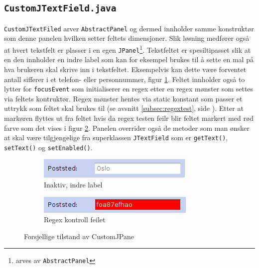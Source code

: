 \subsection{\texttt{CustomJTextField.java}}
\texttt{CustomJTextFiled} arver \texttt{AbstractPanel} og dermed innholder samme konstruktør som denne panelen hvilken setter feltets dimensjoner. Slik løsning medfører også at hvert tekstfelt er plasser i en egen \texttt{JPanel}\footnote{arves av \texttt{AbstractPanel}}.
Tekstfeltet er spesiltipasset slik at en den innholder en indre label som kan for eksempel brukes til å sette en mal på hva brukeren skal skrive inn i tekstfeltet. Eksempelvis kan dette være forventet antall sifferer i et telefon- eller personnummer, figur \ref{fig:custom1}. Feltet innholder også to lytter for \texttt{focusEvent} som initialiserer en regex etter en regex mønster som settes via feltets kontruktør. Regex mønster hentes via static konstant som passer et uttrykk som feltet skal brukes til (se avsnitt \ref{subsec:regextest}, side \pageref{subsec:regextest}). Etter at markøren flyttes ut fra feltet hvis da regex testen feilr blir feltet markert med rød farve som det vises i figur \ref{fig:custom2}.
Panelen overrider også de metoder som man ønsker at skal være tilgjengelige fra superklassen \texttt{JTextField} som er \texttt{getText()}, \texttt{setText()} og \texttt{setEnabled()}.

\begin{figure}[ht!]
\centering
\begin{subfigure}[b]{1\textwidth}
\centering

\includegraphics[scale=0.7]{./img/produktdokumentasjon/swing_componenter/1.png}
\caption{Inaktiv, indre label}
\label{fig:custom1}
\end{subfigure}
\quad

\begin{subfigure}[b]{1\textwidth}
\centering
\includegraphics[scale=0.7]{./img/produktdokumentasjon/swing_componenter/2.png}
\caption{Regex kontroll feilet}
\label{fig:custom2}
\end{subfigure}
\quad

\caption{Forsjellige tilstand av CustomJPane}\label{fig:customjpane}
\end{figure}